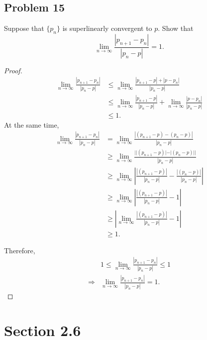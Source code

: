 \documentclass{article}
\begin{document}
\subsection*{Problem 15}
Suppose that $\{p_n\}$ is superlinearly convergent to $p$. Show that 
$$\lim_{n\rightarrow\infty}\frac{|p_{n+1}-p_n|}{|p_n-p|}=1.$$
\begin{proof}
    \begin{align*}
        \lim_{n\rightarrow\infty}\frac{|p_{n+1}-p_n|}{|p_n-p|} & \le
        \lim_{n\rightarrow\infty}\frac{|p_{n+1}-p|+|p-p_n|}{|p_n-p|} \\
        & \le \lim_{n\rightarrow\infty}\frac{|p_{n+1}-p|}{|p_n-p|}+
        \lim_{n\rightarrow\infty}\frac{|p-p_n|}{|p_n-p|} \\
        & \le 1.
    \end{align*}
    At the same time, 
    \begin{align*}
        \lim_{n\rightarrow\infty}\frac{|p_{n+1}-p_n|}{|p_n-p|} & =
        \lim_{n\rightarrow\infty}\frac{|(p_{n+1}-p)-(p_n-p)|}{|p_n-p|} \\
        & \ge \lim_{n\rightarrow\infty}\frac{||(p_{n+1}-p)|-|(p_n-p)||}{|p_n-p|} \\
        & \ge \lim_{n\rightarrow\infty}|\frac{|(p_{n+1}-p)|}{|p_n-p|}-\frac{|(p_n-p)|}{|p_n-p|}| \\
        & \ge \lim_{n\rightarrow\infty}|\frac{|(p_{n+1}-p)|}{|p_n-p|}-1| \\
        & \ge |\lim_{n\rightarrow\infty}\frac{|(p_{n+1}-p)|}{|p_n-p|}-1| \\
        & \ge 1.
    \end{align*}

    Therefore, 
    \begin{align*}
        & 1\le\lim_{n\rightarrow\infty}\frac{|p_{n+1}-p_n|}{|p_n-p|}\le 1 \\
        \Rightarrow & \lim_{n\rightarrow\infty}\frac{|p_{n+1}-p_n|}{|p_n-p|}=1.
    \end{align*}
\end{proof}

\newpage
\section*{Section 2.6}
\end{document}

